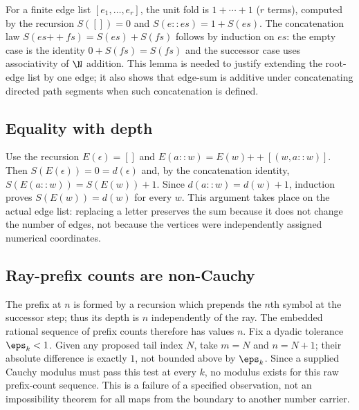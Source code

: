 For a finite edge list $[e_1,\ldots,e_r]$, the unit fold is $1+\cdots+1$ ($r$ terms), computed by the recursion $S([])=0$ and $S(e::es)=1+S(es)$. The concatenation law $S(es\mathbin{+\!+}fs)=S(es)+S(fs)$ follows by induction on $es$: the empty case is the identity $0+S(fs)=S(fs)$ and the successor case uses associativity of $\N$ addition. This lemma is needed to justify extending the root-edge list by one edge; it also shows that edge-sum is additive under concatenating directed path segments when such concatenation is defined.

\subsection{Equality with depth}\label{supp:3-2}
\par{}\par\smallskip

Use the recursion $E(\epsilon)=[]$ and $E(a::w)=E(w)\mathbin{+\!+}[(w,a::w)]$. Then $S(E(\epsilon))=0=d(\epsilon)$ and, by the concatenation identity, $S(E(a::w))=S(E(w))+1$. Since $d(a::w)=d(w)+1$, induction proves $S(E(w))=d(w)$ for every $w$. This argument takes place on the actual edge list: replacing a letter preserves the sum because it does not change the number of edges, not because the vertices were independently assigned numerical coordinates.

\subsection{Ray-prefix counts are non-Cauchy}\label{supp:3-3}
\par{}\par\smallskip

The prefix at $n$ is formed by a recursion which prepends the $n$th symbol at the successor step; thus its depth is $n$ independently of the ray. The embedded rational sequence of prefix counts therefore has values $n$. Fix a dyadic tolerance $\eps_k<1$. Given any proposed tail index $N$, take $m=N$ and $n=N+1$; their absolute difference is exactly $1$, not bounded above by $\eps_k$. Since a supplied Cauchy modulus must pass this test at every $k$, no modulus exists for this raw prefix-count sequence. This is a failure of a specified observation, not an impossibility theorem for all maps from the boundary to another number carrier.

